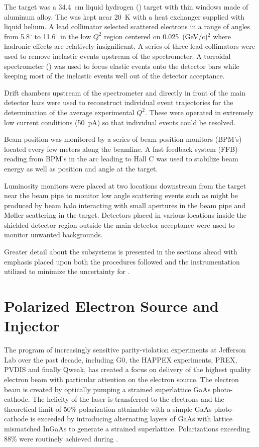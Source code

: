 The target was a 34.4~cm liquid hydrogen (\LH) target with thin windows made of aluminum alloy. The \LHs was kept near 20~K with a heat exchanger supplied with liquid helium. A lead collimator selected scattered electrons in a range of angles from 5.8$^{\circ}$ to  11.6$^{\circ}$ in the low $Q^2$ region centered on 0.025~(GeV/c)$^2$ where hadronic effects are relatively insignificant. A series of three lead collimators were used to remove inelastic events upstream of the spectrometer. A torroidal spectrometer (\qtor) was used to focus elastic events onto the detector bars while keeping most of the inelastic events well out of the detector acceptance.

Drift chambers upstream of the spectrometer and directly in front of the main detector bars were used to reconstruct individual event trajectories for the determination of the average experimental $Q^2$. These were operated in extremely low current conditions (50~pA) so that individual events could be resolved. 

Beam position was monitored by a series of beam position monitors (BPM's) located every few meters along the beamline. A fast feedback system (FFB) reading from BPM's in the arc leading to Hall C  was used to stabilize beam energy as well as position and angle at the target.  

Luminosity monitors were placed at two locations downstream from the target near the beam pipe to monitor low angle scattering events such as might be produced by beam halo interacting with small apertures in the beam pipe and M\o ller scattering in the target. Detectors placed in various locations inside the shielded detector region outside the main detector acceptance were used to monitor unwanted backgrounds. 

Greater detail about the subsystems is presented in the sections ahead with emphasis placed upon both the procedures followed and the instrumentation utilized to minimize the uncertainty for \Q.

\section{\label{sctn:electron_source}Polarized Electron Source and Injector}
The program of increasingly sensitive parity-violation experiments at Jefferson Lab over the past decade, including G0, the HAPPEX experiments, PREX, PVDIS and finally Qweak, has created a focus on delivery of the highest quality electron beam with particular attention on the electron source. The electron beam is created by optically pumping a strained superlattice GaAs photo-cathode. The helicity of the laser is transferred to the electrons and the theoretical limit of 50\% polarization attainable with a simple GaAs photo-cathode is exceeded by introducing alternating layers of GaAs with lattice mismatched InGaAs to generate a strained superlattice\cite{Pierce1975}\cite{Maruyama}. Polarizations exceeding 88\% were routinely achieved during \Q.

